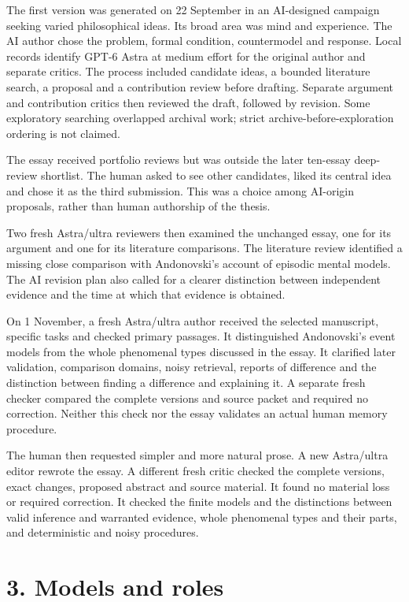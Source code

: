 The first version was generated on 22 September in an AI-designed campaign seeking varied philosophical ideas. Its broad area was mind and experience. The AI author chose the problem, formal condition, countermodel and response. Local records identify GPT-6 Astra at medium effort for the original author and separate critics. The process included candidate ideas, a bounded literature search, a proposal and a contribution review before drafting. Separate argument and contribution critics then reviewed the draft, followed by revision. Some exploratory searching overlapped archival work; strict archive-before-exploration ordering is not claimed.

The essay received portfolio reviews but was outside the later ten-essay deep-review shortlist. The human asked to see other candidates, liked its central idea and chose it as the third submission. This was a choice among AI-origin proposals, rather than human authorship of the thesis.

Two fresh Astra/ultra reviewers then examined the unchanged essay, one for its argument and one for its literature comparisons. The literature review identified a missing close comparison with Andonovski's account of episodic mental models. The AI revision plan also called for a clearer distinction between independent evidence and the time at which that evidence is obtained.

On 1 November, a fresh Astra/ultra author received the selected manuscript, specific tasks and checked primary passages. It distinguished Andonovski's event models from the whole phenomenal types discussed in the essay. It clarified later validation, comparison domains, noisy retrieval, reports of difference and the distinction between finding a difference and explaining it. A separate fresh checker compared the complete versions and source packet and required no correction. Neither this check nor the essay validates an actual human memory procedure.

The human then requested simpler and more natural prose. A new Astra/ultra editor rewrote the essay. A different fresh critic checked the complete versions, exact changes, proposed abstract and source material. It found no material loss or required correction. It checked the finite models and the distinctions between valid inference and warranted evidence, whole phenomenal types and their parts, and deterministic and noisy procedures.

\section*{3. Models and roles}

